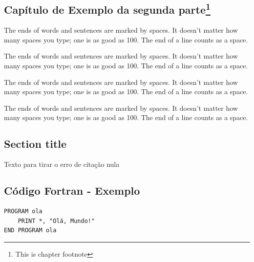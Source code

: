 \cleardoublepage

\begin{frontmatter}
	\chapter{Capítulo de Exemplo da segunda parte\footnote{This is chapter footnote}}\label{chap3}

	\begin{aug}
		\author[addressrefs={ad1,ad2}]%
		{   }%
		\author[addressrefs={ad2}]%
		{ }%
		\address[id=ad1]%
		{Short Address}%
		\address[id=ad2]%
		{Long Address}%
	\end{aug}


	\begin{chapterpoints}%
		\item The ends of words and sentences are marked by spaces. It doesn't
		matter how many spaces you type; one is as good as 100.  The end of
		a line counts as a space.

		\item The ends of words and sentences are marked by spaces. It doesn't
		matter how many spaces you type; one is as good as 100.  The end of
		a line counts as a space.
	\end{chapterpoints}

	\begin{dispquote}

		The ends of words and sentences are marked by spaces. It doesn't
		matter how many spaces you type; one is as good as 100.  The end of
		a line counts as a space.

		The ends of words and sentences are marked by spaces. It doesn't
		matter how many spaces you type; one is as good as 100.  The end of
		a line counts as a space.


	\end{dispquote}

\end{frontmatter}

\section{Section title}\label{sec3.1}

Texto para tirar o erro de citação nula \citep{lopes2024}

\section{Código Fortran - Exemplo}

\begin{lstlisting}
PROGRAM ola
    PRINT *, "Olá, Mundo!"
END PROGRAM ola
\end{lstlisting}



